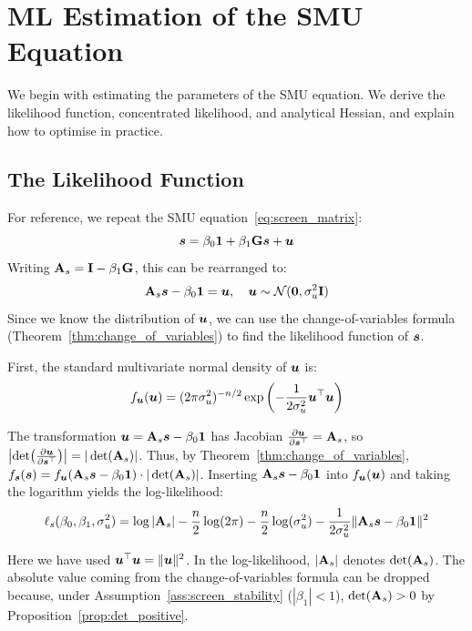 \section{ML Estimation of the SMU Equation}
\label{sec:est:screen_ml}
We begin with estimating the parameters of the SMU equation. We derive the likelihood function, concentrated likelihood, and analytical Hessian, and explain how to optimise in practice.

\subsection{The Likelihood Function}

For reference, we repeat the SMU equation~\eqref{eq:screen_matrix}:
\[
    \bm{s} = \beta_0 \bm{1} + \beta_1 \mathbf{G}\bm{s} + \bm{u}
\]
Writing $\mathbf{A}_s = \mathbf{I} - \beta_1\mathbf{G}$, this can be rearranged to:
\begin{equation}
    \mathbf{A}_s\bm{s} - \beta_0\bm{1} = \bm{u}, \quad \bm{u} \sim \mathcal{N}(\bm{0}, \sigma_u^2\mathbf{I})
\end{equation}
Since we know the distribution of $\bm{u}$, we can use the change-of-variables formula (Theorem~\ref{thm:change_of_variables}) to find the likelihood function of $\bm{s}$.

First, the standard multivariate normal density of $\bm{u}$ is:
\begin{equation}
    f_{\bm{u}}(\bm{u}) = (2\pi\sigma_u^2)^{-n/2} \exp\left(-\frac{1}{2\sigma_u^2}\bm{u}^\top\bm{u}\right)
\end{equation}

The transformation $\bm{u} = \mathbf{A}_s\bm{s} - \beta_0\bm{1}$ has Jacobian $\frac{\partial \bm{u}}{\partial \bm{s}^\top} = \mathbf{A}_s$, so $\left|\det\!\left(\frac{\partial \bm{u}}{\partial \bm{s}^\top}\right)\right| = |\det(\mathbf{A}_s)|$. Thus, by Theorem~\ref{thm:change_of_variables}, $f_{\bm{s}}(\bm{s}) = f_{\bm{u}}(\mathbf{A}_s\bm{s} - \beta_0\bm{1}) \cdot |\det(\mathbf{A}_s)|$. Inserting $\mathbf{A}_s\bm{s} - \beta_0\bm{1}$ into $f_{\bm{u}}(\bm{u})$ and taking the logarithm yields the log-likelihood:
\begin{equation}
\label{eq:loglik_screen}
    \ell_s(\beta_0, \beta_1, \sigma_u^2) = \log|\mathbf{A}_s| - \frac{n}{2}\log(2\pi)
    - \frac{n}{2}\log(\sigma_u^2)
    - \frac{1}{2\sigma_u^2}\|\mathbf{A}_s\bm{s} - \beta_0\bm{1}\|^2
\end{equation}

Here we have used $\bm{u}^\top\bm{u} = \|\bm{u}\|^2$. In the log-likelihood, $|\mathbf{A}_s|$ denotes $\det(\mathbf{A}_s)$. The absolute value coming from the change-of-variables formula can be dropped because, under Assumption~\ref{ass:screen_stability} ($|\beta_1| < 1$), $\det(\mathbf{A}_s) > 0$ by Proposition~\ref{prop:det_positive}.

